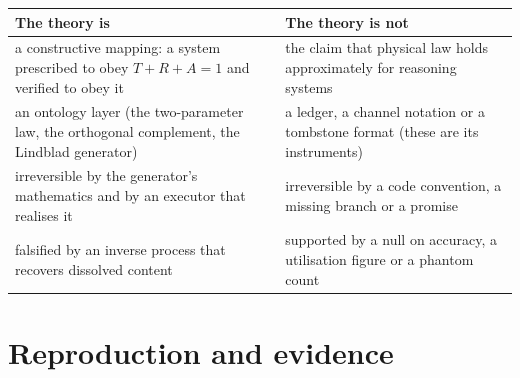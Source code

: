 \documentclass[11pt,a4paper]{article}
\begin{document}
\begin{center}
\begin{tabular}{@{}p{6.0cm}p{7.6cm}@{}}
\toprule
\textbf{The theory is} & \textbf{The theory is not} \\
\midrule
a constructive mapping: a system prescribed to obey $T+R+A=1$ and verified to obey it & the claim that physical law holds approximately for reasoning systems \\
an ontology layer (the two-parameter law, the orthogonal complement, the Lindblad generator) & a ledger, a channel notation or a tombstone format (these are its instruments) \\
irreversible by the generator's mathematics and by an executor that realises it & irreversible by a code convention, a missing branch or a promise \\
falsified by an inverse process that recovers dissolved content & supported by a null on accuracy, a utilisation figure or a phantom count \\
\bottomrule
\end{tabular}
\end{center}

\section*{Reproduction and evidence}
\label{sec:reproduction}
\end{document}

